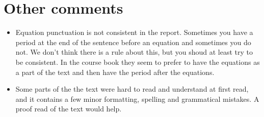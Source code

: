\documentclass[a4paper]{article}
\begin{document}
\section{Other comments}
\begin{itemize}
    \item Equation punctuation is not consistent in the report.
        Sometimes you have a period at the end of the sentence
        before an equation and sometimes you do not. We don't
        think there is a rule about this, but you shoud at least
        try to be consistent. In the course book they seem to prefer
        to have the equations as a part of the text and then have the
        period after the equations.
    \item Some parts of the the text were hard to read and understand at
        first read, and it contains a few minor formatting, spelling and
        grammatical mistakes. A proof read of the text would help.
\end{itemize}
\end{document}
